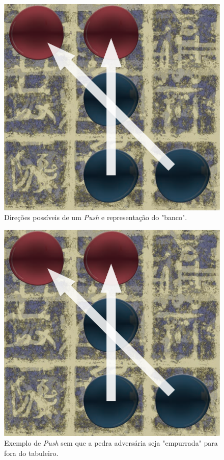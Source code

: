 \documentclass[a4paper]{article}
\begin{document}
\begin{figure}[!htb]
\centering
\includegraphics[scale=0.3]{push.png} 
\caption{Direções possíveis de um \textit{Push} e representação do "banco".}
\end{figure}

\begin{figure}[!htb]
\centering
\includegraphics[scale=0.3]{push.png} 
\caption{Exemplo de \textit{Push} sem que a pedra adversária seja "empurrada" para fora do tabuleiro.}
\end{figure}
\end{document}
